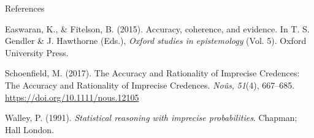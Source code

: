 \documentclass[10pt,ignorenonframetext,x11names, dvipsnames, bibspacing,natbib]{beamer}
\begin{document}
\begin{frame}{References}

\tiny

\hypertarget{refs}{}
\hypertarget{ref-easwaranAndFitelson2015}{}
Easwaran, K., \& Fitelson, B. (2015). Accuracy, coherence, and evidence.
In T. S. Gendler \& J. Hawthorne (Eds.), \emph{Oxford studies in
epistemology} (Vol. 5). Oxford University Press.

\hypertarget{ref-schoenfield2017AccuracyRationalityImprecise}{}
Schoenfield, M. (2017). The Accuracy and Rationality of Imprecise
Credences: The Accuracy and Rationality of Imprecise Credences.
\emph{Noûs}, \emph{51}(4), 667--685.
\url{https://doi.org/10.1111/nous.12105}

\hypertarget{ref-walley1991statistical}{}
Walley, P. (1991). \emph{Statistical reasoning with imprecise
probabilities}. Chapman; Hall London.

\end{frame}
\end{document}
